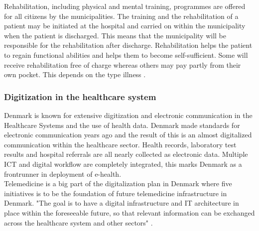 Rehabilitation, including physical and mental training, programmes are offered for all citizens by the municipalities. The training and the rehabilitation of a patient may be initiated at the hospital and carried on within the municipality when the patient is discharged. This means that the municipality will be responsible for the rehabilitation after discharge. Rehabilitation helps the patient to regain functional abilities and helps them to become self-sufficient. Some will receive rehabilitation free of charge whereas others may pay partly from their own pocket. This depends on the type illness \cite{Healthcareindk2, retningsrehab, WHO}.



\subsubsection{Digitization in the healthcare system}

Denmark is known for extensive digitization and electronic communication in the Healthcare Systems and the use of health data. Denmark made standards for electronic communication years ago and the result of this is an almost digitalized communication within the healthcare sector. Health records, laboratory test results and hospital referrals are all nearly collected as electronic data. 
Multiple ICT and digital workflow are completely integrated, this marks Denmark as a frontrunner in deployment of e-health.\\
Telemedicine is a big part of the digitalization plan in Denmark where five initiatives is to be the foundation of future telemedicine infrastructure in Denmark. "The goal is to have a digital infrastructure and IT architecture in place within the foreseeable future, so that relevant information can be exchanged across the healthcare system and other sectors" \cite{Healthcareindk2}.





